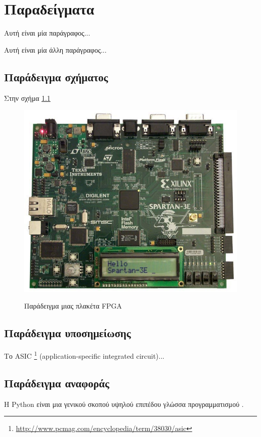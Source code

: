 \documentclass[12pt,a4paper]{report}%
\begin{document}
\chapter{Παραδείγματα}
Αυτή είναι μία παράγραφος...

Αυτή είναι μία άλλη παράγραφος...

\section{Παράδειγμα σχήματος}
Στην σχήμα \ref{fig:fpga_board_example}

\begin{figure}[h!]
\caption{Παράδειγμα μιας πλακέτα FPGA}
\centering
\includegraphics[scale=0.3]{fpga_board_example}
\label{fig:fpga_board_example}
\end{figure}

\section{Παράδειγμα υποσημείωσης}
Το ASIC \footnote{\url{http://www.pcmag.com/encyclopedia/term/38030/asic}} (application-specific integrated circuit)...

\section{Παράδειγμα αναφοράς}
H Python είναι μια γενικού σκοπού υψηλού επιπέδου γλώσσα προγραμματισμού \cite{van2007python}.
\end{document}
